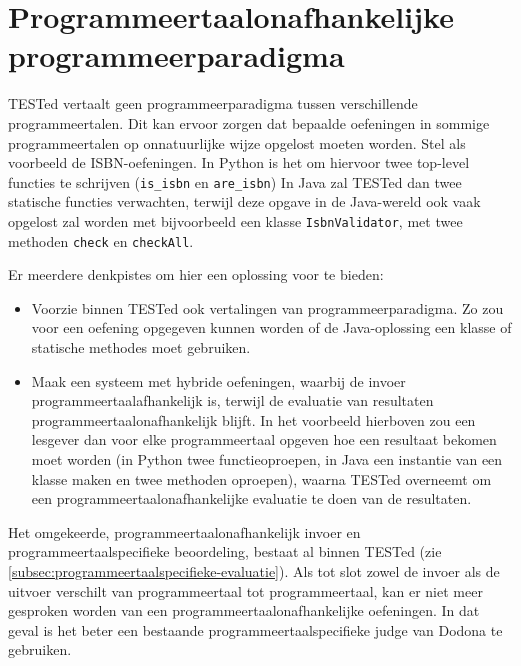 \section{Programmeertaalonafhankelijke programmeerparadigma}\label{sec:programmeerparadigma}

TESTed vertaalt geen programmeerparadigma tussen verschillende programmeertalen.
Dit kan ervoor zorgen dat bepaalde oefeningen in sommige programmeertalen op onnatuurlijke wijze opgelost moeten worden.
Stel als voorbeeld de ISBN-oefeningen.
In Python is het  om hiervoor twee top-level functies te schrijven (\texttt{is\_isbn} en \texttt{are\_isbn})
In Java zal TESTed dan twee statische functies verwachten, terwijl deze opgave in de Java-wereld ook vaak opgelost zal worden met bijvoorbeeld een klasse \texttt{IsbnValidator}, met twee methoden \texttt{check} en \texttt{checkAll}.

Er meerdere denkpistes om hier een oplossing voor te bieden:

\begin{itemize}
    \item Voorzie binnen TESTed ook vertalingen van programmeerparadigma.
    Zo zou voor een oefening opgegeven kunnen worden of de Java-oplossing een klasse of statische methodes moet gebruiken.
    \item Maak een systeem met hybride oefeningen, waarbij de invoer programmeertaalafhankelijk is, terwijl de evaluatie van resultaten programmeertaalonafhankelijk blijft.
    In het voorbeeld hierboven zou een lesgever dan voor elke programmeertaal opgeven hoe een resultaat bekomen moet worden (in Python twee functieoproepen, in Java een instantie van een klasse maken en twee methoden oproepen), waarna TESTed overneemt om een programmeertaalonafhankelijke evaluatie te doen van de resultaten.
\end{itemize}

Het omgekeerde, programmeertaalonafhankelijk invoer en programmeertaalspecifieke beoordeling, bestaat al binnen TESTed (zie \cref{subsec:programmeertaalspecifieke-evaluatie}).
Als tot slot zowel de invoer als de uitvoer verschilt van programmeertaal tot programmeertaal, kan er niet meer gesproken worden van een programmeertaalonafhankelijke oefeningen.
In dat geval is het beter een bestaande programmeertaalspecifieke judge van Dodona te gebruiken.